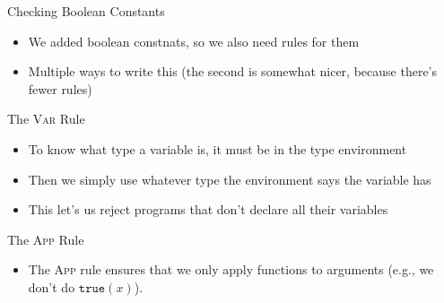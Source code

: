 \documentclass[leqno,presentation,usenames,dvipsnames]{beamer}
\begin{document}
\begin{frame}{Checking Boolean Constants}
    \begin{itemize}
        \item We added boolean constnats, so we also need rules for them
        \item Multiple ways to write this (the second is somewhat nicer, because there's fewer rules)
    \end{itemize}

\begin{mathpar}


\end{mathpar}
\end{frame}

\begin{frame}{The \textsc{Var} Rule}
    \begin{itemize}
        \item To know what type a variable is, it must be in the type environment
        \item Then we simply use whatever type the environment says the variable has
        \item This let's us reject programs that don't declare all their variables
    \end{itemize}

\begin{mathpar}
\end{mathpar}
\end{frame}

\begin{frame}{The \textsc{App} Rule}
    \begin{itemize}
        \item The \textsc{App} rule ensures that we only apply functions to arguments (e.g., we don't do $\texttt{true}(x)$).
    \end{itemize}

\begin{mathpar}
\end{mathpar}
\end{frame}
\end{document}
